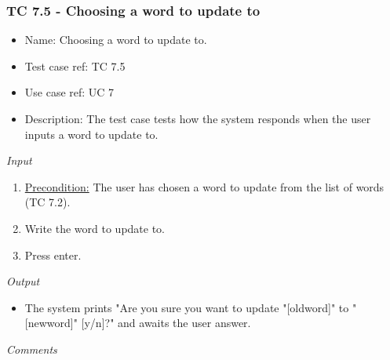 \documentclass[12pt, letterpaper]{article}
\begin{document}
\subsubsection{TC 7.5 - Choosing a word to update to}
\begin{itemize}
	\item Name: Choosing a word to update to.
	\item Test case ref: TC 7.5
	\item Use case ref: UC 7
	\item Description: The test case tests how the system responds when the user inputs a word to update to.
\end{itemize}
\emph{Input}
\begin{enumerate}
	\item \underline{Precondition:} The user has chosen a word to update from the list of words (TC 7.2).
	\item Write the word to update to.
	\item Press enter.
\end{enumerate}
\emph{Output}
\begin{itemize}
	\item The system prints "Are you sure you want to update "[oldword]" to "[newword]" [y/n]?" and awaits the user answer.
\end{itemize}
\begin{Form}
	\newline
	\newline
\end{Form}
\newline
\emph{Comments}
\newline
\newline
\newline
\newline
\newline
\newline
\newline
\end{document}
